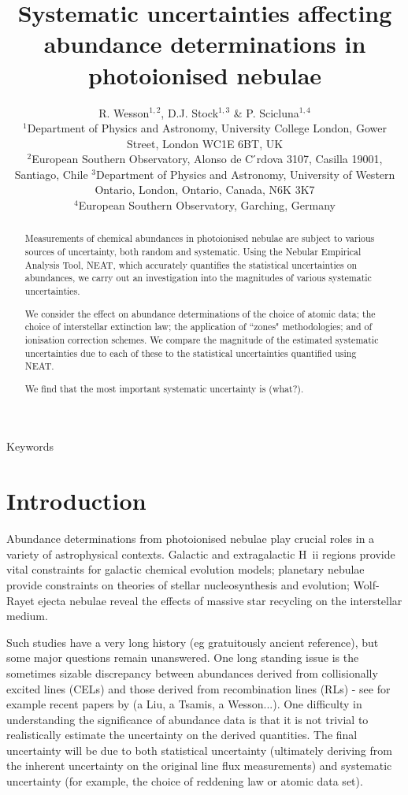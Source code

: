 \documentclass[useAMS,usenatbib]{mn2e}
\title[Systematic nebular abundance uncertainties]{Systematic uncertainties affecting abundance determinations in photoionised nebulae} %
\author[R. Wesson et al.]{R. Wesson$^{1,2}$, D.J. Stock$^{1,3}$ \& P. Scicluna$^{1,4}$\\
$^1$Department of Physics and Astronomy, University College London, Gower Street, London WC1E 6BT, UK\\
$^2$European Southern Observatory, Alonso de C ́rdova 3107, Casilla 19001, Santiago, Chile
$^3$Department of Physics and Astronomy, University of Western Ontario, London, Ontario, Canada, N6K 3K7\\
$^4$European Southern Observatory, Garching, Germany\\ %
}
\begin{document}
\date{}

\pagerange{\pageref{firstpage}--\pageref{lastpage}} 

\maketitle

\label{firstpage}

\begin{abstract}
Measurements of chemical abundances in photoionised nebulae are subject to various sources of uncertainty, both random and systematic.  Using the Nebular Empirical Analysis Tool, NEAT, which accurately quantifies the statistical uncertainties on abundances, we carry out an investigation into the magnitudes of various systematic uncertainties.

We consider the effect on abundance determinations of the choice of atomic data; the choice of interstellar extinction law; the application of ``zones" methodologies; and of ionisation correction schemes.  We compare the magnitude of the estimated systematic uncertainties due to each of these to the statistical uncertainties quantified using NEAT.

We find that the most important systematic uncertainty is (what?).
\end{abstract}

\begin{keywords}
Keywords
\end{keywords}

\section{Introduction}

Abundance determinations from photoionised nebulae play crucial roles in a variety of astrophysical contexts.  Galactic and extragalactic H~{\sc ii} regions provide vital constraints for galactic chemical evolution models; planetary nebulae provide constraints on theories of stellar nucleosynthesis and evolution; Wolf-Rayet ejecta nebulae reveal the effects of massive star recycling on the interstellar medium.

Such studies have a very long history (eg gratuitously ancient reference), but some major questions remain unanswered.  One long standing issue is the sometimes sizable discrepancy between abundances derived from collisionally excited lines (CELs) and those derived from recombination lines (RLs) - see for example recent papers by (a Liu, a Tsamis, a Wesson...).  One difficulty in understanding the significance of abundance data is that it is not trivial to realistically estimate the uncertainty on the derived quantities.  The final uncertainty will be due to both statistical uncertainty (ultimately deriving from the inherent uncertainty on the original line flux measurements) and systematic uncertainty (for example, the choice of reddening law or atomic data set).
\end{document}
